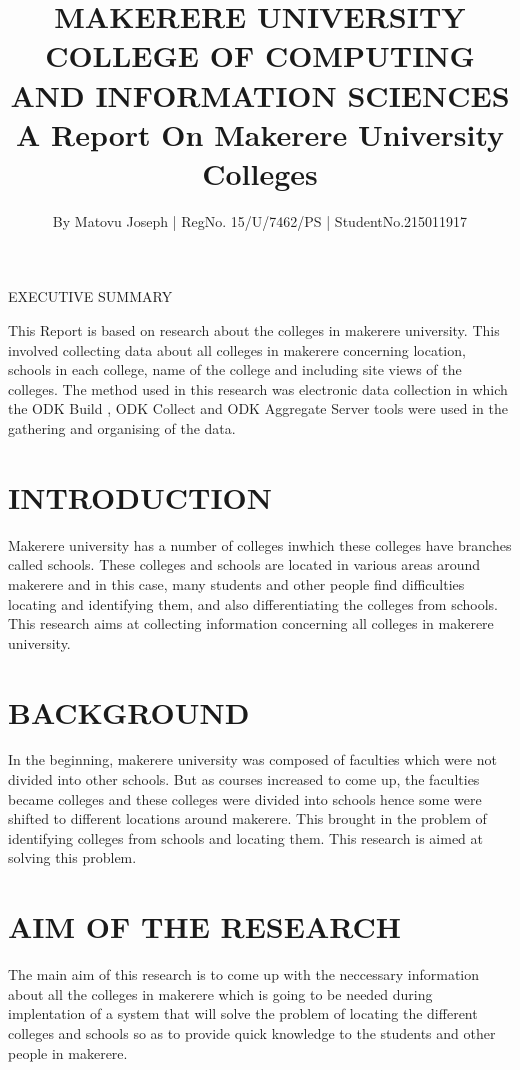 \documentclass[12pt]{article}
\begin{document}
\title{MAKERERE UNIVERSITY\\ COLLEGE OF COMPUTING AND INFORMATION SCIENCES \\ A Report On  Makerere University Colleges}
\author{By Matovu Joseph | RegNo. 15/U/7462/PS | StudentNo.215011917} 
\maketitle


\begin{center}
EXECUTIVE SUMMARY\par
This Report is based on research about the colleges in makerere university. This involved collecting data about all colleges in makerere concerning location, schools in each college, name of the college and including site views of the colleges. The method used in this research was electronic data collection in which the ODK Build , ODK Collect  and ODK Aggregate Server tools were used in the gathering and organising of the data.  
\end{center}

\tableofcontents

\section{INTRODUCTION}
Makerere university has a number of colleges inwhich these colleges have branches called schools. These colleges and schools are located in various areas around makerere and in this case, many students and other people find difficulties locating and identifying them, and also differentiating the colleges from schools. This research aims at collecting information concerning all colleges in makerere university.

\section{BACKGROUND}
In the beginning, makerere university was composed of faculties which were not divided into other schools. But as courses increased to come up, the faculties became colleges and these colleges were divided into schools hence some were shifted to different locations around makerere. This brought in the problem of identifying colleges from schools and locating them. This research is aimed at solving this problem.

\section{AIM OF THE RESEARCH}
The main aim of this research is to come up with the neccessary information about all the colleges in makerere which is going to be needed during implentation of a system that will solve the problem of locating the different colleges and schools so as to provide quick knowledge to the students and other people in makerere.
\end{document}
